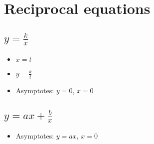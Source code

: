 \section{Reciprocal equations}
\subsection{$y=\frac{k}{x}$}
\begin{itemize}
    \item $x=t$
    \item $y=\frac{k}{t}$
    \item Asymptotes: $y=0$, $x=0$
\end{itemize}

\subsection{$y=ax+\frac{b}{x}$}
\begin{itemize}
    \item Asymptotes: $y=ax$, $x=0$
\end{itemize}